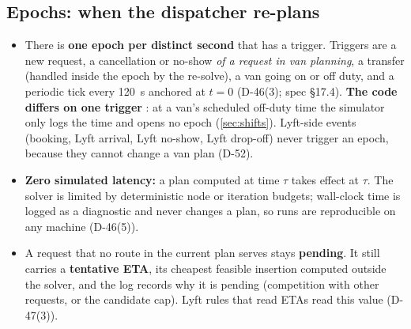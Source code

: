 \documentclass[11pt,letterpaper]{article}
\newcommand{\status}[2]{{\setlength{\fboxsep}{1.1pt}\fcolorbox{#1}{white}{\textcolor{#1}{\sffamily\scriptsize\strut #2}}}}
\newcommand{\Open}{\status{cOpen}{open}}
\newcommand{\D}[1]{D-#1}
\begin{document}
\subsection{Epochs: when the dispatcher re-plans}
\begin{itemize}
\item There is \textbf{one epoch per distinct second} that has a trigger. Triggers are a new request, a cancellation or no-show \emph{of a request in van planning}, a transfer (handled inside the epoch by the re-solve), a van going on or off duty, and a periodic tick every 120~s anchored at $t = 0$ (\D{46}(3); spec §17.4). \textbf{The code differs on one trigger} \Open: at a van's scheduled off-duty time the simulator only logs the time and opens no epoch (\cref{sec:shifts}). Lyft-side events (booking, Lyft arrival, Lyft no-show, Lyft drop-off) never trigger an epoch, because they cannot change a van plan (\D{52}).
\item \textbf{Zero simulated latency:} a plan computed at time $\tau$ takes effect at $\tau$. The solver is limited by deterministic node or iteration budgets; wall-clock time is logged as a diagnostic and never changes a plan, so runs are reproducible on any machine (\D{46}(5)).
\item A request that no route in the current plan serves stays \textbf{pending}. It still carries a \textbf{tentative ETA}, its cheapest feasible insertion computed outside the solver, and the log records why it is pending (competition with other requests, or the candidate cap). Lyft rules that read ETAs read this value (\D{47}(3)).
\end{itemize}
\end{document}
